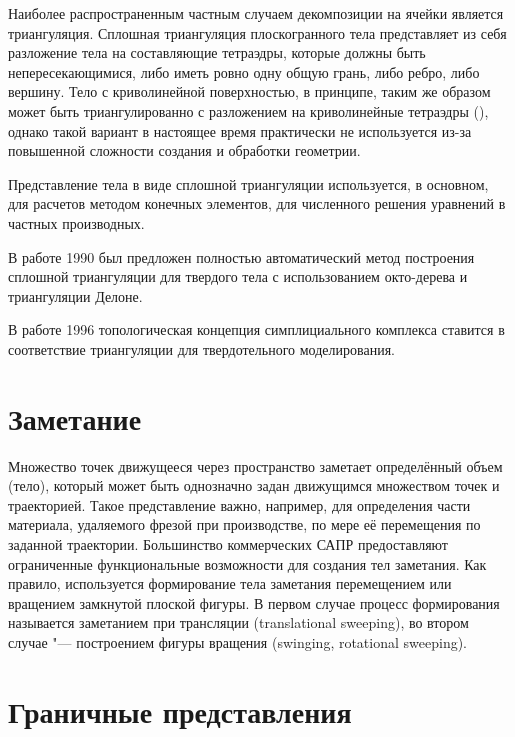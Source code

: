 {{{{{Наиболее распространенным частным случаем декомпозиции на ячейки является триангуляция. Сплошная триангуляция плоскогранного тела представляет из себя разложение тела на составляющие тетраэдры, которые должны быть непересекающимися, либо иметь ровно одну общую грань, либо ребро, либо вершину. Тело с криволинейной поверхностью, в принципе, таким же образом может быть триангулированно с разложением на криволинейные тетраэдры (), однако такой вариант в настоящее время практически не используется из-за повышенной сложности создания и обработки геометрии.

Представление тела в виде сплошной триангуляции используется, в основном, для расчетов методом конечных элементов, для численного решения уравнений в частных производных.

В работе \cite{A combined octree/Delaunay method for fully automatic 3-d mesh generation} 1990 был предложен полностью автоматический метод построения сплошной триангуляции для твердого тела с использованием окто-дерева и триангуляции Делоне.

В работе \cite{Modeling with Simplicial Complexes} 1996 топологическая концепция симплициального комплекса ставится в соответствие триангуляции для твердотельного моделирования. 


\section{Заметание} \label{sect_sweeping}

Множество точек движущееся через пространство заметает определённый объем (тело), который может быть однозначно задан движущимся множеством точек и траекторией. Такое представление важно, например, для определения части материала, удаляемого фрезой при производстве, по мере её перемещения по заданной траектории. Большинство коммерческих САПР предоставляют ограниченные функциональные возможности для создания тел заметания. Как правило, используется формирование тела заметания перемещением или вращением замкнутой плоской фигуры. В первом случае процесс формирования называется заметанием при трансляции (translational sweeping), во втором случае "--- построением фигуры вращения (swinging, rotational sweeping).

\section{Граничные представления} \label{sect_boundary_rep}

}}}}}
